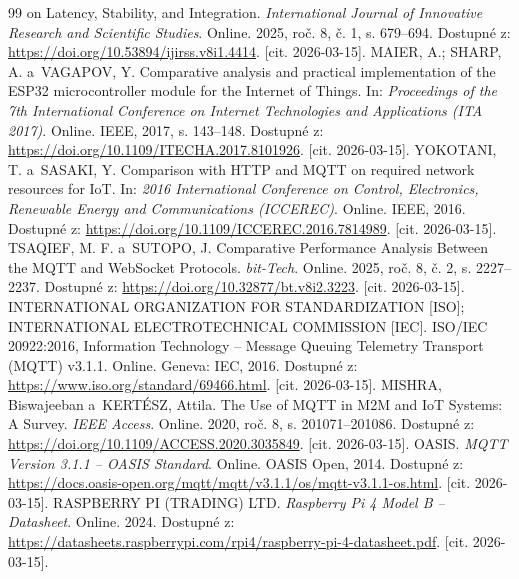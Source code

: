\begin{thebibliography}{99}
    on Latency, Stability, and Integration.
    \textit{International Journal of Innovative Research and
    Scientific Studies}. Online. 2025, roč. 8, č. 1,
    s. 679--694.
    Dostupné z: \url{https://doi.org/10.53894/ijirss.v8i1.4414}. [cit. 2026-03-15].
    MAIER, A.; SHARP, A. a~VAGAPOV, Y.
    Comparative analysis and practical implementation of
    the ESP32 microcontroller module for the Internet of Things.
    In: \textit{Proceedings of the 7th International Conference
    on Internet Technologies and Applications (ITA 2017)}.
    Online. IEEE, 2017, s. 143--148.
    Dostupné z: \url{https://doi.org/10.1109/ITECHA.2017.8101926}. [cit. 2026-03-15].
    YOKOTANI, T. a~SASAKI, Y.
    Comparison with HTTP and MQTT on required network
    resources for IoT.
    In: \textit{2016 International Conference on Control,
    Electronics, Renewable Energy and Communications
    (ICCEREC)}. Online. IEEE, 2016.
    Dostupné z: \url{https://doi.org/10.1109/ICCEREC.2016.7814989}. [cit. 2026-03-15].
    TSAQIEF, M. F. a~SUTOPO, J.
    Comparative Performance Analysis Between the MQTT
    and WebSocket Protocols.
    \textit{bit-Tech}. Online. 2025, roč. 8, č. 2,
    s. 2227--2237.
    Dostupné z: \url{https://doi.org/10.32877/bt.v8i2.3223}. [cit. 2026-03-15].
    INTERNATIONAL ORGANIZATION FOR STANDARDIZATION [ISO];
    INTERNATIONAL ELECTROTECHNICAL COMMISSION [IEC].
    ISO/IEC 20922:2016, Information Technology -- Message
    Queuing Telemetry Transport (MQTT) v3.1.1. Online.
    Geneva: IEC, 2016.
    Dostupné z: \url{https://www.iso.org/standard/69466.html}. [cit. 2026-03-15].
    MISHRA, Biswajeeban a~KERTÉSZ, Attila.
    The Use of MQTT in M2M and IoT Systems: A Survey.
    \textit{IEEE Access}. Online. 2020, roč. 8,
    s. 201071--201086.
    Dostupné z: \url{https://doi.org/10.1109/ACCESS.2020.3035849}. [cit. 2026-03-15].
    OASIS.
    \textit{MQTT Version 3.1.1 -- OASIS Standard}. Online.
    OASIS Open, 2014.
    Dostupné z: \url{https://docs.oasis-open.org/mqtt/mqtt/v3.1.1/os/mqtt-v3.1.1-os.html}. [cit. 2026-03-15].
    RASPBERRY PI (TRADING) LTD.
    \textit{Raspberry Pi 4 Model B -- Datasheet}. Online. 2024.
    Dostupné z: \url{https://datasheets.raspberrypi.com/rpi4/raspberry-pi-4-datasheet.pdf}. [cit. 2026-03-15].

\end{thebibliography}
